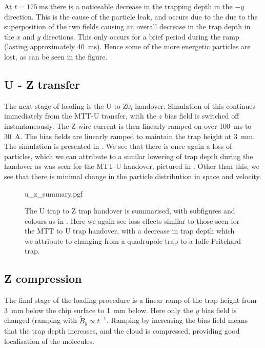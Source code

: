 At $t=\SI{175}{\milli\second}$ there is a noticeable decrease in the trapping
depth in the $-y$ direction. This is the cause of the particle leak, and occurs
due to the due to the superposition of the two fields causing an overall
decrease in the trap depth in the $x$ and $y$ directions. This only occurs for
a brief period during the ramp (lasting approximately \SI{40}{\milli\second}).
Hence some of the more energetic particles are lost, as can be seen in the
figure.

\subsection{U - Z transfer}
\label{design:sim:U_to_Z0i}

The next stage of loading is the U to $\mathrm{Z0_i}$ handover. Simulation of
this continues immediately from the MTT-U transfer, with the $z$
bias field is switched off instantaneously. The Z-wire current is then linearly
ramped on over \SI{100}{\milli\second} to \SI{30}{\ampere}. The bias fields are
linearly ramped to maintain the trap height at \SI{3}{\milli\meter}.
%
The simulation is presented in . We see that
there is once again a loss of particles, which we can attribute to a similar
lowering of trap depth during the handover as was seen for the MTT-U handover,
pictured in . Other than this, we see that
there is minimal change in the particle distribution in space and velocity.

\begin{figure}[p]
\centering
  {u_z_summary.pgf}
  \caption{
    The U trap to Z trap handover is summarised, with subfigures and colours as
    in . Here we again see loss effects similar
    to those seen for the MTT to U trap handover, with a decrease in trap depth
    which we attribute to changing from a quadrupole trap to a Ioffe-Pritchard
    trap.
  }
  \label{design:fig:uzsim}
\end{figure}

\subsection{Z compression}

The final stage of the loading procedure is a linear ramp of the trap height
from \SI{3}{\milli\meter} below the chip surface to \SI{1}{\milli\meter} below.
Here only the $y$ bias field is changed (ramping with $\tilde{B}_y \propto
t^{-1}$. Ramping by increasing the bias field means that the trap depth
increases, and the cloud is compressed, providing good localisation of the
molecules.

